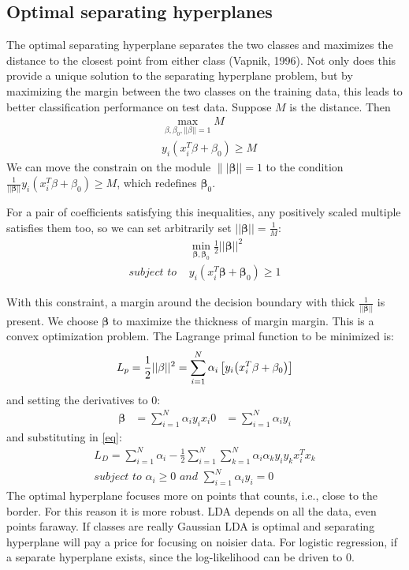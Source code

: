 \documentclass[12pt, letterpaper]{article}
\theoremstyle{definition}
\newcommand{\be}{\mathbf{\beta}}
\DeclarePairedDelimiter\autobracket{(}{)}
\newcommand{\br}[1]{\autobracket*{#1}}
\begin{document}
\subsection{Optimal separating hyperplanes}
\label{OSH}
The optimal separating hyperplane separates the two classes and maximizes the distance to the closest point from either class (Vapnik, 1996). Not only does this provide a unique solution to the separating hyperplane problem, but by maximizing the margin between the two classes on the training data, this leads to better classification performance on test data.
Suppose $M$ is the distance. Then
\begin{equation}
\begin{aligned}
&\max\limits_{\beta,\beta_0, ||\beta||=1} M \\
& y_i(x_i^T\beta + \beta_0) \ge M
\end{aligned}
\end{equation}
We  can move the constrain on the module $\||\be||=1$ to the condition $\frac{1}{||\be||}y_i(x_i^T\beta + \beta_0) \ge M$, which redefines $\be_0$. 

For a pair of coefficients satisfying this inequalities, any positively scaled multiple satisfies them too, so we can set arbitrarily set $||\be||=\frac{1}{M}$:
\begin{equation}
\begin{aligned}
&\min_{\be, \be_0}{\frac{1}{2}||\be||^2}\\
\textit{subject to } &y_i(x_i^T\be+\be_0)\ge1
\end{aligned}
\end{equation}

With this constraint, a margin around the decision boundary with thick $\frac{1}{||\be||}$ is present. We choose $\be$ to maximize the thickness of margin margin.  This is a convex optimization problem. The Lagrange primal function to be minimized is:
\begin{equation}
\label{eq}
L_p = \frac{1}{2} ||\be||^2 = \sum_{i=1}^N \alpha_i\left[ y_i \br{x_i^T\be+\be_0}\right]
\end{equation}
and setting the derivatives to $0$:
\begin{equation}
\begin{aligned}
\be &= \sum_{i=1}^N \alpha_i y_i x_i
0  &= \sum_{i=1}^N \alpha_i y_i
\end{aligned}
\end{equation}
and substituting in \ref{eq}:
\begin{equation}
\begin{aligned}
L_D = \sum_{i=1}^N \alpha_i -\frac{1}{2}\sum_{i=1}^N\sum_{k=1}^N \alpha_i \alpha_ky_iy_kx_i^Tx_k\\
\textit{subject to } \alpha_i\ge0 \textit{ and } \sum_{i=1}^N \alpha_iy_i=0
\end{aligned}
\end{equation}
The optimal hyperplane focuses more on points that counts, i.e., close to the border. For this reason it is more robust. LDA depends on all the data, even points faraway. If classes are really Gaussian LDA is optimal and separating hyperplane will pay a price for focusing on noisier data.
For logistic regression, if a separate hyperplane exists, since the log-likelihood can be driven to $0$.
\end{document}
